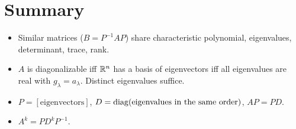 \section*{Summary}
\begin{itemize}
  \item Similar matrices ($B=P^{-1}AP$) share characteristic polynomial, eigenvalues, determinant, trace, rank.
  \item $A$ is diagonalizable iff $\mathbb{R}^n$ has a basis of eigenvectors iff all eigenvalues are real with
        $g_\lambda=a_\lambda$. Distinct eigenvalues suffice.
  \item $P=[\text{eigenvectors}]$, $D=\operatorname{diag}(\text{eigenvalues in the same order})$, $AP=PD$.
  \item $A^k=PD^kP^{-1}$.
\end{itemize}
